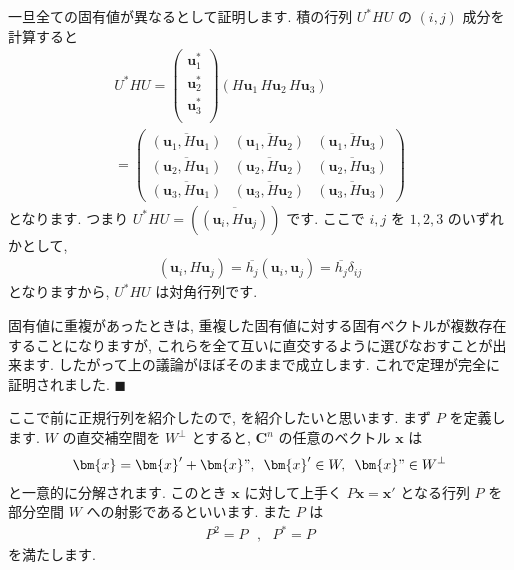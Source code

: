 \documentclass[openany, a4paper, oneside]{jsbook}
\theoremstyle{break}
\theoremstyle{breakdefn}
\begin{document}
一旦全ての固有値が異なるとして証明します.
積の行列 $U^* H U$ の $(i,j)$ 成分を計算すると
    \begin{gather}
        U^* H U
        =
        \begin{pmatrix}
            \bm{u}_1^* \\
            \bm{u}_2^* \\
            \bm{u}_3^* \\
        \end{pmatrix}
        ( H \bm{u}_1 \, H \bm{u}_2 \, H \bm{u}_3 ) \\
        =
        \begin{pmatrix}
            \overline{ (\bm{u}_1 , H \bm{u}_1 ) } & \overline{ (\bm{u}_1 , H \bm{u}_2 ) } & \overline{ (\bm{u}_1 , H \bm{u}_3 ) } \\
            \overline{ (\bm{u}_2 , H \bm{u}_1 ) } & \overline{ (\bm{u}_2 , H \bm{u}_2 ) } & \overline{ (\bm{u}_2 , H \bm{u}_3 ) } \\
            \overline{ (\bm{u}_3 , H \bm{u}_1 ) } & \overline{ (\bm{u}_3 , H \bm{u}_2 ) } & \overline{ (\bm{u}_3 , H \bm{u}_3 ) }
        \end{pmatrix}
    \end{gather}
となります. つまり $U^* H U = \left ( \overline{ \left ( \bm{u}_i , H \bm{u}_j \right) } \right)$ です.
ここで $i,j$ を $1,2,3$ のいずれかとして,
    \begin{align}
        ( \bm{u}_i , H \bm{u}_j )
        =
        \overline{h_j} ( \bm{u}_i , \bm{u}_j )
        =
        \overline{h_j} \delta _{ij}
    \end{align}
となりますから,  $U^* H U$ は対角行列です.

固有値に重複があったときは, 重複した固有値に対する固有ベクトルが複数存在することになりますが,
これらを全て互いに直交するように選びなおすことが出来ます.
したがって上の議論がほぼそのままで成立します.
これで定理が完全に証明されました.  $\blacksquare$

ここで前に正規行列を紹介したので, を紹介したいと思います.
まず $P$ を定義します.
$W$ の直交補空間を $W^{\perp }$ とすると,  $\bm{C}^n$ の任意のベクトル $\bm{x}$ は
    \begin{align}
        \bm{x} = \bm{x}' + \bm{x}" , \,\,\, \bm{x}' \in W, \,\,\, \bm{x}" \in W^{\perp}
    \end{align}
と一意的に分解されます. このとき $\bm{x}$ に対して上手く $P\bm{x}=\bm{x}'$
となる行列 $P$ を部分空間 $W$ への射影であるといいます. また $P$ は
    \begin{align}
        P^2 = P\,\,\,\,,\,\,\,\,P^{*}=P
    \end{align}
を満たします.
\end{document}
